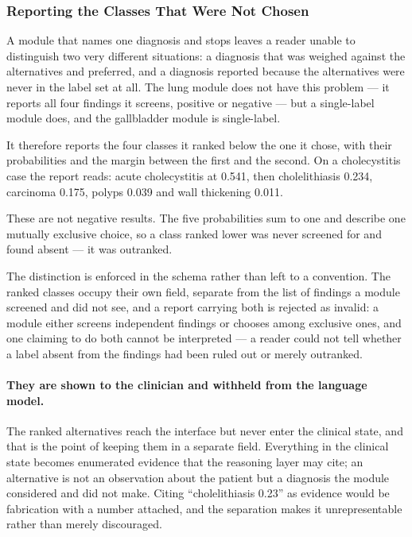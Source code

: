 \subsubsection{Reporting the Classes That Were Not Chosen}
\label{subsec:gallbladder-alternatives}

A module that names one diagnosis and stops leaves a reader unable to distinguish two very
different situations: a diagnosis that was weighed against the alternatives and preferred, and
a diagnosis reported because the alternatives were never in the label set at all. The lung
module does not have this problem --- it reports all four findings it screens, positive or
negative --- but a single-label module does, and the gallbladder module is single-label.

It therefore reports the four classes it ranked below the one it chose, with their
probabilities and the margin between the first and the second. On a cholecystitis case the
report reads: acute cholecystitis at 0.541, then cholelithiasis 0.234, carcinoma 0.175, polyps
0.039 and wall thickening 0.011.

\begin{keystatement}
These are not negative results. The five probabilities sum to one and describe one mutually
exclusive choice, so a class ranked lower was never screened for and found absent --- it was
outranked.
\end{keystatement}

The distinction is enforced in the schema rather than left to a convention. The ranked classes
occupy their own field, separate from the list of findings a module screened and did not see,
and a report carrying both is rejected as invalid: a module either screens independent findings
or chooses among exclusive ones, and one claiming to do both cannot be interpreted --- a reader
could not tell whether a label absent from the findings had been ruled out or merely outranked.

\paragraph{They are shown to the clinician and withheld from the language model.} The ranked
alternatives reach the interface but never enter the clinical state, and that is the point of
keeping them in a separate field. Everything in the clinical state becomes enumerated evidence
that the reasoning layer may cite; an alternative is not an observation about the patient but a
diagnosis the module considered and did not make. Citing ``cholelithiasis 0.23'' as evidence
would be fabrication with a number attached, and the separation makes it unrepresentable rather
than merely discouraged.


